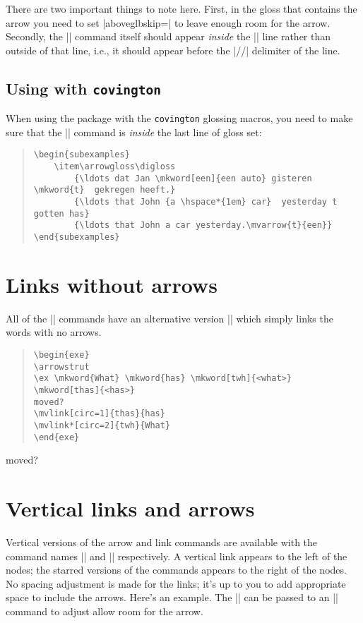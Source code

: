\documentclass[11pt]{article}
\newcommand*{\pkg}[1]{\texttt{#1}}
\begin{document}
{There are two important things to note here. First, in the gloss that contains the arrow you need to set  |aboveglbskip=\glarrowheight| to leave enough room for the arrow. Secondly, the |\mvarrow| command itself should appear \emph{inside} the |\glft| line rather than outside of that line, i.e., it should appear before the |//| delimiter of the line.
\subsection{Using with \pkg{covington}}
When using the package with the \pkg{covington} glossing macros, you need to make sure that the |\mvarrow| command is \emph{inside} the last line of gloss set:

\begin{quote}
\begin{lstlisting}
\begin{subexamples}
	\item\arrowgloss\digloss
	    {\ldots dat Jan \mkword[een]{een auto} gisteren \mkword{t}  gekregen heeft.}
	    {\ldots that John {a \hspace*{1em} car}  yesterday t gotten has}
	    {\ldots that John a car yesterday.\mvarrow{t}{een}}	    
\end{subexamples}
\end{lstlisting}
\end{quote}

\section{Links without arrows}
All of the |\mvarrow| commands have an alternative version |\mvlink| which simply links the words with no arrows. 

\begin{quote}
\begin{lstlisting}
\begin{exe}
\arrowstrut
\ex \mkword{What} \mkword{has} \mkword[twh]{<what>} \mkword[thas]{<has>}
moved? 
\mvlink[circ=1]{thas}{has} 
\mvlink*[circ=2]{twh}{What}
\end{exe}
\end{lstlisting}
\end{quote}

\begin{exe}
\arrowstrut
\ex {}   
moved? 
\end{exe}
\section{Vertical links and arrows}
Vertical versions of the arrow and link commands are available with the command names |\varrow| and |\vlink| respectively. A vertical link appears to the left of the nodes; the starred versions of the commands appears to the right of the nodes. No spacing adjustment is made for the links; it's up to you to add appropriate space to include the arrows.  Here's an example. The |\arrowlength| can be passed to an |\hspace| command to adjust allow room for the arrow.

}
\end{document}
